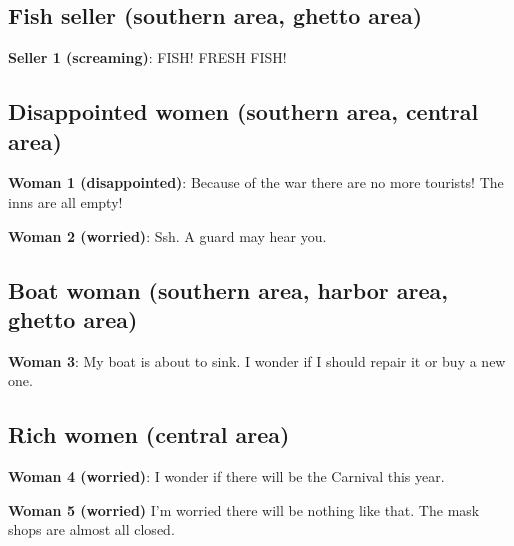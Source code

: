 \subsection{Fish seller (southern area, ghetto area)}
\textbf{Seller 1 (screaming)}: FISH! FRESH FISH!

\subsection{Disappointed women (southern area, central area)}
\textbf{Woman 1 (disappointed)}: Because of the war there are no more tourists! The inns are all empty!

\textbf{Woman 2 (worried)}: Ssh. A guard may hear you.

\subsection{Boat woman (southern area, harbor area, ghetto area)}
\textbf{Woman 3}: My boat is about to sink. I wonder if I should repair it or buy a new one.

\subsection{Rich women (central area)}
\textbf{Woman 4 (worried)}: I wonder if there will be the Carnival this year.

\textbf{Woman 5 (worried)} I'm worried there will be nothing like that. The mask shops are almost all closed.
